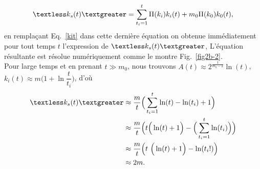 \begin{eqnarray}
\kms=\sum_{t_i=1}^t\Pi(k_i)k_i(t)+m_0\Pi(k_0)k_0(t),
\label{kms-2}
\end{eqnarray}
 en remplaçant Eq.~\ref{kit} dans cette dernière équation on obtenue immédiatement pour tout temps $ t $ l'expression de $\kms$, L'équation résultante est résolue numériquement comme le montre Fig.~\ref{fig2b-2}. \\
Pour large temps et en prenant $t \gg m_0$, nous trouvons 
$A(t)\approx 2^{\frac{1}{m_0-2}} \ln(t)$, $k_i(t)\approx m\Big(1+\ln \dfrac{t}{t_i}\Big)$, d'où
\begin{align}
\label{kom}
\kms&\approx\dfrac{m}{t}\Big(\sum_{t_i=1}^{t} \ln(t)-\ln(t_i)+1\Big)\\
&\approx\dfrac{m}{t}\Big(t \Big(\ln(t)+1\Big)-\Big(\sum_{t_i=1}^{t} \ln(t_i)\Big)\Big) \nonumber \\
&\approx\dfrac{m}{t}\Big(t\ \Big(\ln(t)+1\Big)-\ln(t_i!)\Big) \nonumber \\
&\approx2m. \nonumber
\end{align}


